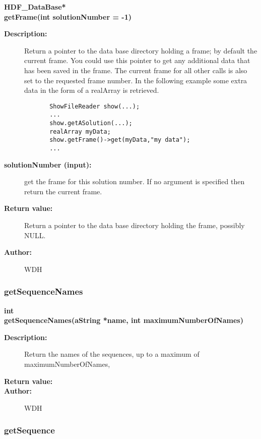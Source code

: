 \begin{flushleft} \textbf{%
HDF\_DataBase*  \\ 
\settowidth{\ShowFileReaderIncludeArgIndent}{getFrame(}%
getFrame(int solutionNumber  = -1)
}\end{flushleft}
\begin{description}
\item[{\bf Description:}] 
     Return a pointer to the data base directory holding a frame; by default the current frame.
     You could use this pointer to get any additional data that has been saved in the frame.
     The current frame for all other calls is also set to the requested frame number.
      In the following example some extra data in the form of a realArray is retrieved.
    \begin{verbatim}
       ShowFileReader show(...);
       ...
       show.getASolution(...);
       realArray myData;
       show.getFrame()->get(myData,"my data");
       ...
    \end{verbatim}
\item[{\bf solutionNumber (input):}]  get the frame for this solution number. If no argument is specified then
    return the current frame. 
\item[{\bf Return value:}]  Return a pointer to the data base directory holding the frame, possibly NULL.
\item[{\bf Author:}]  WDH
\end{description}
\subsubsection{getSequenceNames}
 
\begin{flushleft} \textbf{%
int  \\ 
\settowidth{\ShowFileReaderIncludeArgIndent}{getSequenceNames(}%
getSequenceNames(aString *name, int maximumNumberOfNames)
}\end{flushleft}
\begin{description}
\item[{\bf Description:}] 
     Return the names of the sequences, up to a maximum of maximumNumberOfNames,
\item[{\bf Return value:}]  
\item[{\bf Author:}]  WDH
\end{description}
\subsubsection{getSequence}
 

